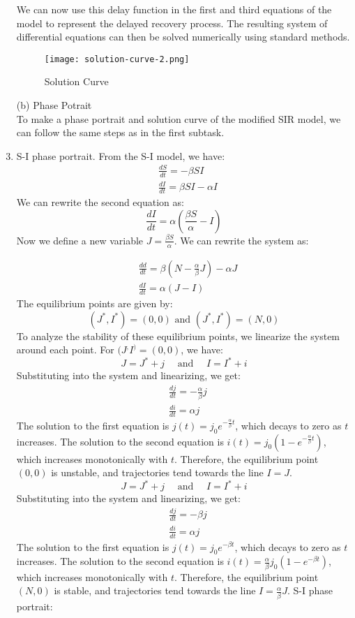 \documentclass{article}
\begin{document}
\begin{enumerate}
We can now use this delay function in the first and third equations of the model to represent the delayed recovery process. The resulting system of differential equations can then be solved numerically using standard methods.
\begin{figure}[htbp]
\centering
\texttt{[image: solution-curve-2.png]}
\caption{Solution Curve}
\label{fig:architecture}
\end{figure}

\item[(b)] Phase Potrait\\
To make a phase portrait and solution curve of the modified SIR model, we can follow the same steps as in the first subtask. \\
\item S-I phase portrait. From the S-I model, we have:
$$
\begin{aligned}
& \frac{d S}{d t}=-\beta S I \\
& \frac{d I}{d t}=\beta S I-\alpha I
\end{aligned}
$$
We can rewrite the second equation as:
$$
\frac{d I}{d t}=\alpha\left(\frac{\beta S}{\alpha}-I\right)
$$
Now we define a new variable $J=\frac{\beta S}{\alpha}$. We can rewrite the system as:


$$
\begin{aligned}
& \frac{d d}{d t}=\beta\left(N-\frac{\alpha}{\beta} J\right)-\alpha J \\
& \frac{d I}{d t}=\alpha(J-I)
\end{aligned}
$$
The equilibrium points are given by:
$$
\left(J^*, I^*\right)=(0,0) \text { and }\left(J^*, I^*\right)=(N, 0)
$$
To analyze the stability of these equilibrium points, we linearize the system around each point. For $(J^, I^) = (0, 0)$, we have:
$$
J=J^*+j \quad \text { and } \quad I=I^*+i
$$
Substituting into the system and linearizing, we get:
$$
\begin{aligned}
& \frac{d j}{d t}=-\frac{\alpha}{\beta} j \\
& \frac{d i}{d t}=\alpha j
\end{aligned}
$$
The solution to the first equation is $j(t) = j_0 e^{-\frac{\alpha}{\beta} t}$, which decays to zero as $t$ increases. The solution to the second equation is $i(t) = j_0 \left(1 - e^{-\frac{\alpha}{\beta} t}\right)$, which increases monotonically with $t$. Therefore, the equilibrium point $(0,0)$ is unstable, and trajectories tend towards the line $I = J$.
$$
J=J^*+j \quad \text { and } \quad I=I^*+i
$$
Substituting into the system and linearizing, we get:
$$
\begin{aligned}
& \frac{d j}{d t}=-\beta j \\
& \frac{d i}{d t}=\alpha j
\end{aligned}
$$
The solution to the first equation is $j(t) = j_0 e^{-\beta t}$, which decays to zero as $t$ increases. The solution to the second equation is $i(t) = \frac{\alpha}{\beta}j_0 \left(1 - e^{-\beta t}\right)$, which increases monotonically with $t$. Therefore, the equilibrium point $(N,0)$ is stable, and trajectories tend towards the line $I = \frac{\alpha}{\beta} J$.
S-I phase portrait:


\end{enumerate}
\end{document}

